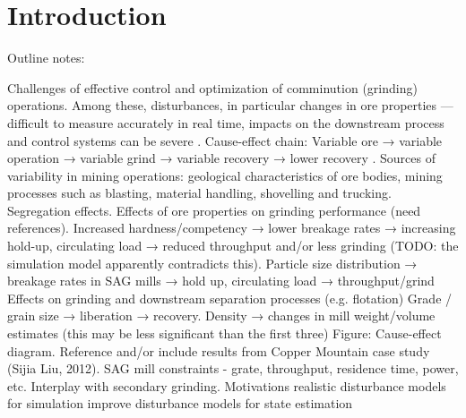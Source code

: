 \chapter*{Introduction}         %
\label{chap-introduction}       %


Outline notes:

\begin{outline}
	\1 Challenges of effective control and optimization of comminution (grinding) operations.
	\1 Among these, disturbances, in particular changes in ore properties — difficult to measure accurately in real time, impacts on the downstream process and control systems can be severe \citep{herbst_optimal_1988}.
	\1 Cause-effect chain: Variable ore → variable operation → variable grind → variable recovery → lower recovery \citep{powell_applying_2009}.
	\1 Sources of variability in mining operations: geological characteristics of ore bodies, mining processes such as blasting, material handling, shovelling and trucking. Segregation effects.
	\1 Effects of ore properties on grinding performance (need references).
	\2 Increased hardness/competency → lower breakage rates → increasing hold-up, circulating load → reduced throughput and/or less grinding (TODO: the simulation model apparently contradicts this).
	\2 Particle size distribution → breakage rates in SAG mills → hold up, circulating load → throughput/grind
	\2 Effects on grinding and downstream separation processes (e.g. flotation)
	\2 Grade / grain size → liberation → recovery.
	\2 Density → changes in mill weight/volume estimates (this may be less significant than the first three)
	\1 Figure: Cause-effect diagram.
	\1 Reference and/or include results from Copper Mountain case study (Sijia Liu, 2012).
	\1 SAG mill constraints - grate, throughput, residence time, power, etc. Interplay with secondary grinding.
	\1 Motivations
	\2 realistic disturbance models for simulation
	\2 improve disturbance models for state estimation
\end{outline}

